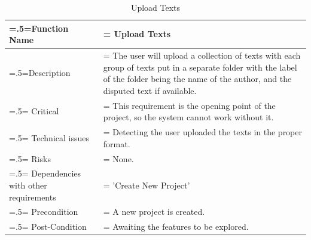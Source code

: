 \begin{center}
    \begin{table}[H]
        \caption{Upload Texts}
        \begin{tabularx}{\textwidth} {
                | >{\raggedright\arraybackslash\hsize=.5\hsize\linewidth=\hsize}X
                | >{\raggedright\arraybackslash\hsize=1.5\hsize\linewidth=\hsize}X |}
            \hline
            Function Name                        & Upload Texts                                                                                                                                                                                \\ \hline
            Description                          & The user will upload a collection of texts with each group of texts put in a separate folder with the label of the folder being the name of the author, and the disputed text if available. \\ \hline
            Critical                             & This requirement is the opening point of the project, so the system cannot work without it.                                                                                                 \\ \hline
            Technical issues                     & Detecting the user uploaded the texts in the proper format.                                                                                                                                 \\ \hline
            Risks                                & None.                                                                                                                                                                                       \\ \hline
            Dependencies with other requirements & 'Create New Project'                                                                                                                                                                        \\ \hline
            Precondition                         & A new project is created.                                                                                                                                                                   \\ \hline
            Post-Condition                       & Awaiting the features to be explored.                                                                                                                                                       \\ \hline
        \end{tabularx}
    \end{table}
\end{center}

